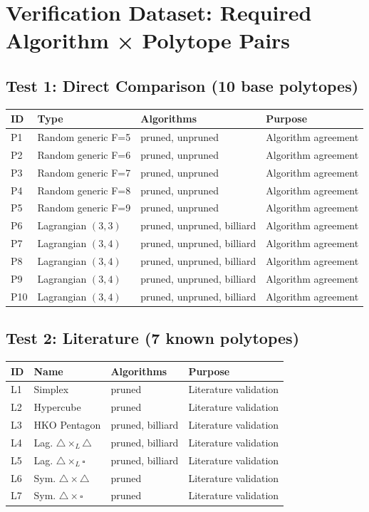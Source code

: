 \documentclass{article}
\begin{document}
\section*{Verification Dataset: Required Algorithm × Polytope Pairs}

\subsection*{Test 1: Direct Comparison (10 base polytopes)}

\begin{tabular}{lllp{5cm}}
\toprule
ID & Type & Algorithms & Purpose \\
\midrule
P1 & Random generic F=5 & pruned, unpruned & Algorithm agreement \\
P2 & Random generic F=6 & pruned, unpruned & Algorithm agreement \\
P3 & Random generic F=7 & pruned, unpruned & Algorithm agreement \\
P4 & Random generic F=8 & pruned, unpruned & Algorithm agreement \\
P5 & Random generic F=9 & pruned, unpruned & Algorithm agreement \\
P6 & Lagrangian $(3,3)$ & pruned, unpruned, billiard & Algorithm agreement \\
P7 & Lagrangian $(3,4)$ & pruned, unpruned, billiard & Algorithm agreement \\
P8 & Lagrangian $(3,4)$ & pruned, unpruned, billiard & Algorithm agreement \\
P9 & Lagrangian $(3,4)$ & pruned, unpruned, billiard & Algorithm agreement \\
P10 & Lagrangian $(3,4)$ & pruned, unpruned, billiard & Algorithm agreement \\
\bottomrule
\end{tabular}

\subsection*{Test 2: Literature (7 known polytopes)}

\begin{tabular}{lllp{5cm}}
\toprule
ID & Name & Algorithms & Purpose \\
\midrule
L1 & Simplex & pruned & Literature validation \\
L2 & Hypercube & pruned & Literature validation \\
L3 & HKO Pentagon & pruned, billiard & Literature validation \\
L4 & Lag. $\triangle \times_L \triangle$ & pruned, billiard & Literature validation \\
L5 & Lag. $\triangle \times_L \square$ & pruned, billiard & Literature validation \\
L6 & Sym. $\triangle \times \triangle$ & pruned & Literature validation \\
L7 & Sym. $\triangle \times \square$ & pruned & Literature validation \\
\bottomrule
\end{tabular}
\end{document}
